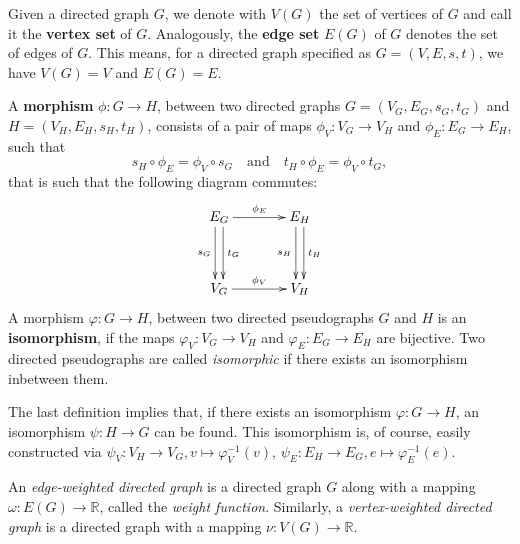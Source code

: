 Given a directed graph $G$, we denote with $V(G)$ the set of vertices
of $G$ and call it the \textbf{vertex set} of $G$. Analogously, the
\textbf{edge set} $E(G)$ of $G$ denotes the set of edges of $G$. This
means, for a directed graph specified as $G = (V,E,s,t)$, we
have $V(G) = V$ and $E(G) = E$.

A \textbf{morphism} $\phi: G \to H$, between two directed graphs
$G=(V_G,E_G,s_G,t_G)$ and $H=(V_H,E_H,s_H,t_H)$, consists of a pair of
maps $\phi_V: V_G \to V_H$ and $\phi_E: E_G \to E_H$, such that
\[
s_H \circ \phi_E = \phi_V \circ s_G \mathrm{\quad and \quad} t_H \circ
\phi_E = \phi_V \circ t_G,
\]
that is such that the following diagram commutes:
%
\begin{align*} 
  \xymatrix@+=1.3cm{E_G \ar^{t_G}@<0.66ex>[d] \ar_{s_G}@<-0.66ex>[d]
    \ar^{\phi_E}[r] & E_H \ar^{t_H}@<0.66ex>[d]
    \ar_{s_H}@<-0.66ex>[d]\\ V_G \ar^{\phi_V}[r] & V_H}
\end{align*}
%
A morphism $\varphi: G \to H$, between two directed pseudographs $G$
and $H$ is an \textbf{isomorphism}, if the maps $\varphi_V: V_G \to
V_H$ and $\varphi_E: E_G \to E_H$ are bijective. Two directed
pseudographs are called \textit{isomorphic} if there exists an
isomorphism inbetween them.

\begin{remark}
  The last definition implies that, if there exists an isomorphism
  $\varphi: G \to H$, an isomorphism $\psi: H \to G$ can be
  found. This isomorphism is, of course, easily constructed via
  $\psi_V: V_H \to V_G, v \mapsto \varphi_V^{-1}(v)$, $\psi_E: E_H \to
  E_G, e \mapsto \varphi_E^{-1}(e)$.
\end{remark}

\begin{definition}
  An \textit{edge-weighted directed graph} is a directed graph $G$ along
  with a mapping $\omega: E(G) \to \mathbb{R}$, called the
  \textit{weight function}. Similarly, a \textit{vertex-weighted
    directed graph} is a directed graph with a mapping $\nu: V(G) \to
  \mathbb{R}$.
\end{definition}

